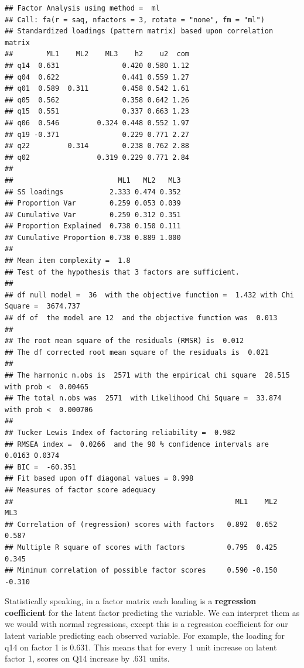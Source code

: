 \documentclass[
]{book}
\begin{document}
\begin{verbatim}
## Factor Analysis using method =  ml
## Call: fa(r = saq, nfactors = 3, rotate = "none", fm = "ml")
## Standardized loadings (pattern matrix) based upon correlation matrix
##        ML1    ML2    ML3    h2    u2  com
## q14  0.631               0.420 0.580 1.12
## q04  0.622               0.441 0.559 1.27
## q01  0.589  0.311        0.458 0.542 1.61
## q05  0.562               0.358 0.642 1.26
## q15  0.551               0.337 0.663 1.23
## q06  0.546         0.324 0.448 0.552 1.97
## q19 -0.371               0.229 0.771 2.27
## q22         0.314        0.238 0.762 2.88
## q02                0.319 0.229 0.771 2.84
## 
##                         ML1   ML2   ML3
## SS loadings           2.333 0.474 0.352
## Proportion Var        0.259 0.053 0.039
## Cumulative Var        0.259 0.312 0.351
## Proportion Explained  0.738 0.150 0.111
## Cumulative Proportion 0.738 0.889 1.000
## 
## Mean item complexity =  1.8
## Test of the hypothesis that 3 factors are sufficient.
## 
## df null model =  36  with the objective function =  1.432 with Chi Square =  3674.737
## df of  the model are 12  and the objective function was  0.013 
## 
## The root mean square of the residuals (RMSR) is  0.012 
## The df corrected root mean square of the residuals is  0.021 
## 
## The harmonic n.obs is  2571 with the empirical chi square  28.515  with prob <  0.00465 
## The total n.obs was  2571  with Likelihood Chi Square =  33.874  with prob <  0.000706 
## 
## Tucker Lewis Index of factoring reliability =  0.982
## RMSEA index =  0.0266  and the 90 % confidence intervals are  0.0163 0.0374
## BIC =  -60.351
## Fit based upon off diagonal values = 0.998
## Measures of factor score adequacy             
##                                                     ML1    ML2    ML3
## Correlation of (regression) scores with factors   0.892  0.652  0.587
## Multiple R square of scores with factors          0.795  0.425  0.345
## Minimum correlation of possible factor scores     0.590 -0.150 -0.310
\end{verbatim}

Statistically speaking, in a factor matrix each loading is a \textbf{regression coefficient} for the latent factor predicting the variable. We can interpret them as we would with normal regressions, except this is a regression coefficient for our latent variable predicting each observed variable. For example, the loading for q14 on factor 1 is 0.631. This means that for every 1 unit increase on latent factor 1, scores on Q14 increase by .631 units.
\end{document}
